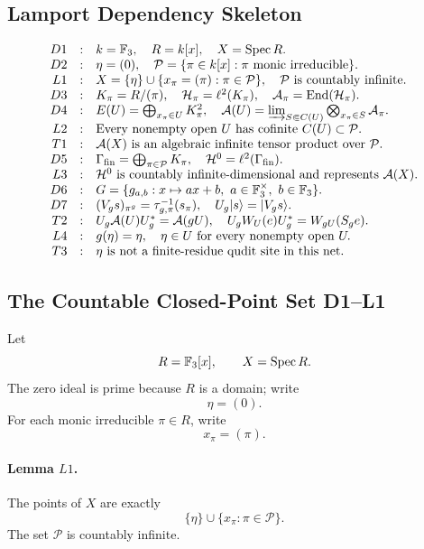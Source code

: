 \subsection{Lamport Dependency Skeleton}
\[
\begin{array}{rcl}
D1&:&k=\mathbb F_3,\quad R=k[x],\quad X=\Spec R.\\
D2&:&\eta=(0),\quad \mathcal P=\{\pi\in k[x]:\pi
      \text{ monic irreducible}\}.\\
L1&:&X=\{\eta\}\cup\{x_\pi=(\pi):\pi\in\mathcal P\},\quad
      \mathcal P\text{ is countably infinite}.\\
D3&:&K_\pi=R/(\pi),\quad \mathcal H_\pi=\ell^2(K_\pi),\quad
      \mathcal A_\pi=\operatorname{End}(\mathcal H_\pi).\\
D4&:&E(U)=\bigoplus_{x_\pi\in U}K_\pi^2,\quad
      \mathcal A(U)=\varinjlim_{S\Subset C(U)}
      \bigotimes_{x_\pi\in S}\mathcal A_\pi.\\
L2&:&\text{Every nonempty open }U\text{ has cofinite }
      C(U)\subset\mathcal P.\\
T1&:&\mathcal A(X)\text{ is an algebraic infinite tensor product over }
      \mathcal P.\\
D5&:&\Gamma_{\rm fin}=\bigoplus_{\pi\in\mathcal P}K_\pi,\quad
      \mathcal H^0=\ell^2(\Gamma_{\rm fin}).\\
L3&:&\mathcal H^0\text{ is countably infinite-dimensional and represents }
      \mathcal A(X).\\
D6&:&G=\{g_{a,b}:x\mapsto ax+b,\ a\in\mathbb F_3^\times,\ b\in\mathbb F_3\}.\\
D7&:&(V_gs)_{\pi^g}=\tau_{g,\pi}^{-1}(s_\pi),\quad
      U_g|s\rangle=|V_gs\rangle.\\
T2&:&U_g\mathcal A(U)U_g^*=\mathcal A(gU),\quad
      U_gW_U(e)U_g^*=W_{gU}(S_ge).\\
L4&:&g(\eta)=\eta,\quad \eta\in U\text{ for every nonempty open }U.\\
T3&:&\eta\text{ is not a finite-residue qudit site in this net.}
\end{array}
\]

\subsection{The Countable Closed-Point Set D1--L1}
Let
\[
  R=\mathbb F_3[x],\qquad X=\operatorname{Spec} R.
\]
The zero ideal is prime because \(R\) is a domain; write
\[
  \eta=(0).
\]
For each monic irreducible \(\pi\in R\), write
\[
  x_\pi=(\pi).
\]

\paragraph{Lemma \(L1\).}
The points of \(X\) are exactly
\[
  \{\eta\}\cup\{x_\pi:\pi\in\mathcal P\}.
\]
The set \(\mathcal P\) is countably infinite.

